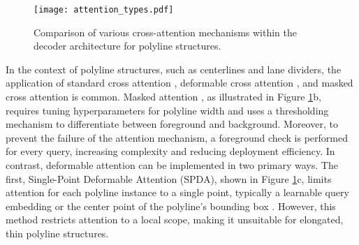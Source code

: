 
\begin{figure}[tb]
  \centering
  \texttt{[image: attention\_types.pdf]}
  \caption{Comparison of various cross-attention mechanisms within the decoder architecture for polyline structures.}
  \label{fig: attention_types}
\end{figure}

In the context of polyline structures, such as centerlines and lane dividers, the application of standard cross attention \cite{can2021structured, liu2023petrv2}, deformable cross attention \cite{li2023graph, wu2023topomlp, liao2022maptr, luo2023latr, li2023lanesegnet, liu2023vectormapnet, bai2023curveformer, zhou2024himap, choi2024mask2map, liu2024leveraging, xu2024insmapper, yu2023scalablemap}, and masked cross attention \cite{qiao2023end, ding2023pivotnet, zhou2024himap, kalfaoglu2024topomaskv2} is common. Masked attention \cite{cheng2022masked}, as illustrated in Figure \ref{fig: attention_types}b, requires tuning hyperparameters for polyline width and uses a thresholding mechanism to differentiate between foreground and background. Moreover, to prevent the failure of the attention mechanism, a foreground check is performed for every query, increasing complexity and reducing deployment efficiency. In contrast, deformable attention \cite{zhudeformable} can be implemented in two primary ways. The first, Single-Point Deformable Attention (SPDA), shown in Figure \ref{fig: attention_types}c, limits attention for each polyline instance to a single point, typically a learnable query embedding or the center point of the polyline’s bounding box \cite{liu2023vectormapnet, li2023graph, wu2023topomlp}. However, this method restricts attention to a local scope, making it unsuitable for elongated, thin polyline structures.

